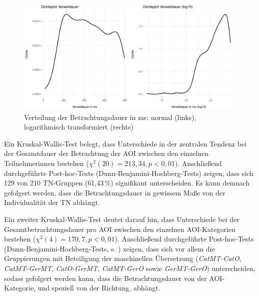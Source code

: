 \begin{figure}
    \includegraphics[width=\textwidth]{Figures/EyeTracking/CatDe/ggplot_catde-Dwell_density_de}
	\caption{Verteilung der Betrachtungsdauer in ms: normal (links), logarithmisch transformiert (rechts)}
	\label{K6:fig:CatDe:density-dwell}
\end{figure}


Ein Kruskal-Wallis-Test belegt, dass Unterschiede in der zentralen Tendenz bei der Gesamtdauer der Betrachtung der AOI zwischen den einzelnen Teilnehmer{\textperiodcentered}innen bestehen ($\chi^2(20) = 213,34, p < 0,01$). Anschließend durchgeführte Post-hoc-Tests (Dunn-Benjamini-Hochberg-Tests) zeigen, dass sich 129 von 210 TN-Gruppen (61,43\,\%) signifikant unterscheiden. Es kann demnach gefolgert werden, dass die Betrachtungsdauer in gewissem Maße von der Individualität der TN abhängt.

Ein zweiter Kruskal-Wallis-Test deutet darauf hin, dass Unterschiede bei der Gesamtbetrachtungsdauer pro AOI zwischen den einzelnen AOI-Kategorien bestehen ($\chi^2(4) = 170,7, p < 0,01$). Anschließend durchgeführte Post-hoc-Tests (Dunn-Benjamini-Hochberg-Tests, s. ) zeigen, dass sich vor allem die Gruppierungen mit Beteiligung der maschinellen Übersetzung (\emph{CatMT-CatO}, \emph{CatMT-GerMT}, \emph{CatO-GerMT}, \emph{CatMT-GerO} sowie \emph{GerMT-GerO}) unterscheiden, sodass gefolgert werden kann, dass die Betrachtungsdauer von der AOI-Kategorie, und speziell von der Richtung, abhängt.


